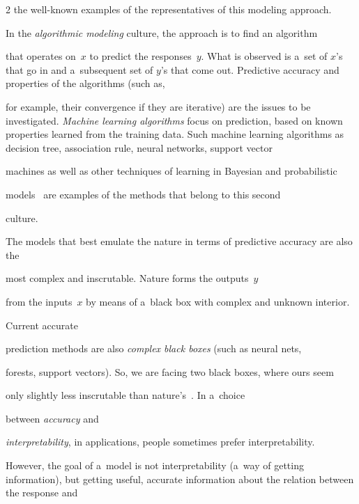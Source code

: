 \begin{multicols}{2}
the well-known examples of the representatives of this modeling approach.










  In the \textit{algorithmic modeling} culture, the approach is to find an algorithm


that operates on~$x$ to predict the responses~$y$. What is observed is a~set of $x$'s that go in and a~subsequent set of $y$'s that come out. Predictive accuracy and properties of the algorithms (such as,


for example, their convergence if they are iterative) are the issues to be investigated. \textit{Machine learning algorithms} focus on prediction, based on known properties learned from the training data. Such machine learning algorithms as decision tree, association rule, neural networks, support vector


machines as well as other techniques of learning in Bayesian and probabilistic


models~\cite{38-kl, 37-kl} are examples of the methods that belong to this second


culture.





  The models that best emulate the nature in terms of predictive accuracy are also the


most complex and inscrutable. Nature forms the outputs~$y$


from the inputs~$x$ by means of a~black box with complex and unknown interior.


Current accurate


prediction methods are also \textit{complex black boxes} (such as neural nets,


forests, support vectors). So, we are facing two black boxes, where ours seem


only slightly less inscrutable than nature's~\cite{36-kl}. In a~choice


between \textit{accuracy} and


\textit{interpretability}, in applications, people sometimes prefer interpretability.





  However, the goal of a~model is not interpretability (a~way of getting information), but getting useful, accurate information about the relation between the response and



\end{multicols}
